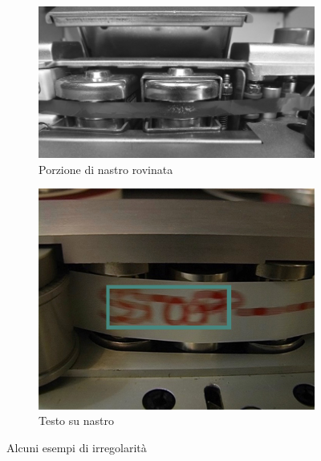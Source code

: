 \begin{figure}
     \centering
     \begin{subfigure}{0.45\textwidth}
         \centering
         \includegraphics[width=\textwidth]{img/nastro_rovinato.png}
         \caption{Porzione di nastro rovinata \cite{prettoComputingMethodologiesSupporting2018}}
         \label{fig:nastro-rovinato}
     \end{subfigure}
     \hfill
     \begin{subfigure}{0.45\textwidth}
         \centering
         \includegraphics[width=\textwidth]{img/nastro_testo.png}
         \caption{Testo su nastro \cite{canazzaGestureMusicComputer2022}}
         \label{fig:nastro-testo}
     \end{subfigure}
        \caption{Alcuni esempi di irregolarità}
        \label{fig:nastro-irrs}
\end{figure}


